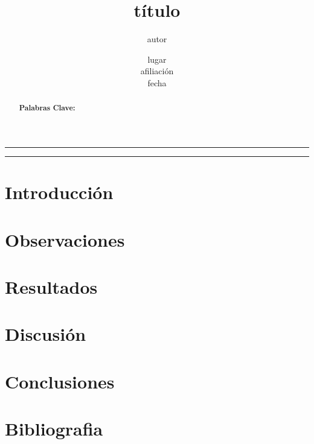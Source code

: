 \documentclass[12pt,letterpaper,openany,twocolumn,]{article} %
\author{autor} %
\title{título} %
\date{lugar\\afiliación\\fecha} %
\begin{document}
\maketitle %
\begin{center}\rule{0.9\textwidth}{0.1mm} \end{center}
\begin{abstract}

{\bf Palabras Clave:} %
\end{abstract}
\begin{center}\rule{0.9\textwidth}{0.1mm} \end{center}


\section{Introducción}

\section{Observaciones}

\section{Resultados}

\section{Discusión}

\section{Conclusiones}

\section{Bibliografia}


\newpage
\appendix
\end{document}
